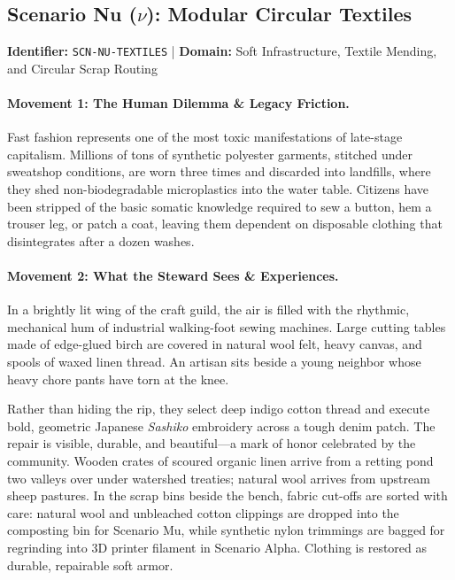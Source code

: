 \subsection{Scenario Nu (\texorpdfstring{$\nu$}{Nu}): Modular Circular Textiles}
\label{subsec:scn_nu}
\textbf{Identifier:} \texttt{SCN-NU-TEXTILES} \quad | \quad \textbf{Domain:} Soft Infrastructure, Textile Mending, and Circular Scrap Routing

\paragraph{Movement 1: The Human Dilemma \& Legacy Friction.}
Fast fashion represents one of the most toxic manifestations of late-stage capitalism. Millions of tons of synthetic polyester garments, stitched under sweatshop conditions, are worn three times and discarded into landfills, where they shed non-biodegradable microplastics into the water table. Citizens have been stripped of the basic somatic knowledge required to sew a button, hem a trouser leg, or patch a coat, leaving them dependent on disposable clothing that disintegrates after a dozen washes.

\paragraph{Movement 2: What the Steward Sees \& Experiences.}
In a brightly lit wing of the craft guild, the air is filled with the rhythmic, mechanical hum of industrial walking-foot sewing machines. Large cutting tables made of edge-glued birch are covered in natural wool felt, heavy canvas, and spools of waxed linen thread. An artisan sits beside a young neighbor whose heavy chore pants have torn at the knee. 

Rather than hiding the rip, they select deep indigo cotton thread and execute bold, geometric Japanese \textit{Sashiko} embroidery across a tough denim patch. The repair is visible, durable, and beautiful---a mark of honor celebrated by the community. Wooden crates of scoured organic linen arrive from a retting pond two valleys over under watershed treaties; natural wool arrives from upstream sheep pastures. In the scrap bins beside the bench, fabric cut-offs are sorted with care: natural wool and unbleached cotton clippings are dropped into the composting bin for Scenario Mu, while synthetic nylon trimmings are bagged for regrinding into 3D printer filament in Scenario Alpha. Clothing is restored as durable, repairable soft armor.

